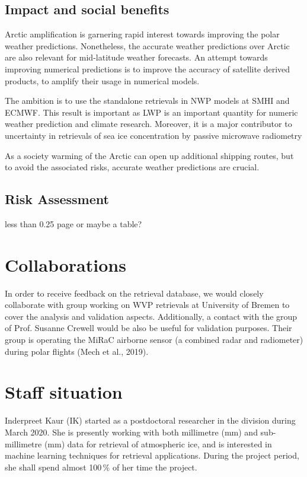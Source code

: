 \documentclass[12pt,oneside,a4paper]{article}
\begin{document}

\subsection{Impact and social benefits}
%
\label{sec:impact}
Arctic amplification is garnering rapid interest towards improving the polar weather predictions. Nonetheless, the accurate weather predictions over Arctic are also relevant for mid-latitude weather forecasts. An attempt towards improving numerical predictions is to improve the accuracy of satellite derived products, to amplify their usage in numerical models.

The ambition is to use the standalone retrievals in NWP models at SMHI and ECMWF.
This result is important as LWP is an important quantity for numeric weather prediction and climate research. Moreover, it is a major contributor to uncertainty in retrievals of sea ice concentration by passive microwave radiometry  

As a society warming of the Arctic can open up additional shipping routes, but to avoid the associated risks, accurate weather predictions are crucial.

\subsection{Risk Assessment}
%
\label{risk}

less than 0.25 page or maybe a table?

\section{Collaborations}

In order to receive feedback on the retrieval database, we would closely collaborate with group working on WVP retrievals at University of Bremen to cover the analysis and validation aspects. Additionally, a contact with the group of Prof. Susanne Crewell would be also be useful for validation purposes. Their group is operating the MiRaC airborne sensor (a combined radar and radiometer) during polar flights (Mech et al., 2019).

\section{Staff situation}
\label{sec:staff}
%
Inderpreet Kaur (IK) started as a postdoctoral researcher in the division during March 2020.  She is presently working with both millimetre (mm) and sub-millimetre (mm) data for retrieval of atmospheric ice, and is interested in machine learning techniques for retrieval applications. During the project period, she shall spend almost 100\,\% of her time the project. 
\end{document}
